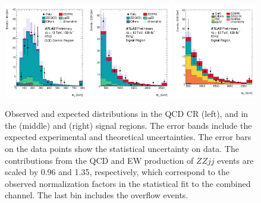 \begin{figure}[!htbp]
\begin{center}
\includegraphics[width=0.325\textwidth]{figures/4l/MJJ_4l_QCD_CR_v1.pdf}
\includegraphics[width=0.325\textwidth]{figures/4l/MJJ_4l_SR_v1.pdf}
\includegraphics[width=0.325\textwidth]{figures/llvv/MJJ_2l2v_SR_v1.pdf}\\
\end{center}
\caption{Observed and expected \mjj distributions in the \lllljj QCD CR (left), 
        and in the \lllljj (middle) and \llvvjj (right) signal regions.
        The error bands include the expected experimental and theoretical uncertainties.
        The error bars on the data points show the statistical uncertainty on data.
        The contributions from the QCD and EW production of $ZZjj$ events are scaled by 0.96 and 1.35, respectively, 
        which correspond to the observed normalization factors in the statistical fit to the combined channel.
        The last bin includes the overflow events.
        }
\label{fig:mjj}
\end{figure}

